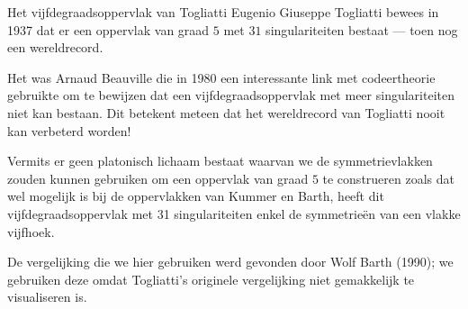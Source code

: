 \begin{surferPage}[Togliatti]{Het vijfdegraadsoppervlak van Togliatti}
    Eugenio Giuseppe Togliatti bewees in 1937 dat er een oppervlak van graad $5$ met $31$ singulariteiten bestaat --- toen nog een wereldrecord.


    Het was Arnaud Beauville die in 1980 een interessante link met codeertheorie gebruikte om te bewijzen dat een vijfdegraadsoppervlak met meer singulariteiten niet kan bestaan. 
    Dit betekent meteen dat het wereldrecord van Togliatti nooit kan verbeterd worden!

    Vermits er geen platonisch lichaam bestaat waarvan we de symmetrievlakken zouden kunnen gebruiken om een oppervlak van graad $5$ te construeren zoals dat wel mogelijk is bij de oppervlakken van Kummer en Barth, heeft dit vijfdegraadsoppervlak met 31 singulariteiten enkel de symmetrie\"en van een vlakke vijfhoek.

 De vergelijking die we hier gebruiken werd gevonden door Wolf Barth (1990); we gebruiken deze omdat Togliatti's originele vergelijking niet gemakkelijk te visualiseren is.
\end{surferPage}
